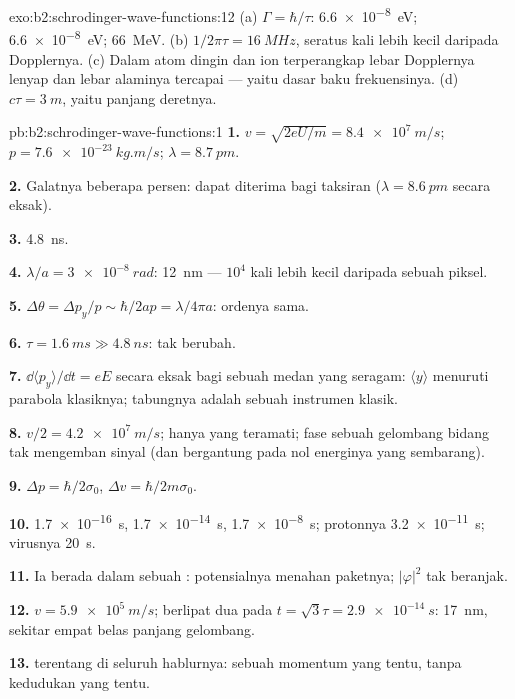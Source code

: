 \begin{solution}{exo:b2:schrodinger-wave-functions:12}
(a) $\Gamma = \hbar/\tau$: \qty{6.6e-8}{eV}; \qty{6.6e-8}{eV}; \qty{66}{MeV}. (b)
$1/2\pi\tau = \qty{16}{MHz}$, seratus kali lebih kecil daripada Dopplernya. (c) Dalam
atom dingin dan ion terperangkap lebar Dopplernya lenyap dan lebar
alaminya tercapai --- yaitu dasar baku frekuensinya. (d) $c\tau =
\qty{3}{m}$, yaitu panjang deretnya.
\end{solution}

\begin{solution}{pb:b2:schrodinger-wave-functions:1}
\textbf{1.} $v = \sqrt{2eU/m} = \qty{8.4e7}{m/s}$; $p = \qty{7.6e-23}{kg.m/s}$; $\lambda =
\qty{8.7}{pm}$.

\textbf{2.} Galatnya beberapa persen: dapat diterima bagi taksiran ($\lambda =
\qty{8.6}{pm}$ secara eksak).

\textbf{3.} \qty{4.8}{ns}.

\textbf{4.} $\lambda/a = \qty{3e-8}{rad}$: \qty{12}{nm} --- $10^4$ kali lebih kecil daripada sebuah
piksel.

\textbf{5.} $\Delta\theta = \Delta p_y/p \sim \hbar/2ap = \lambda/4\pi a$: ordenya sama.

\textbf{6.} $\tau = \qty{1.6}{ms} \gg \qty{4.8}{ns}$: tak berubah.

\textbf{7.} $\dd\langle p_y\rangle/\dd t = eE$ secara eksak bagi sebuah medan yang seragam:
$\langle y\rangle$ menuruti parabola klasiknya; tabungnya adalah sebuah
instrumen klasik.

\textbf{8.} $v/2 = \qty{4.2e7}{m/s}$; hanya  yang teramati;
fase sebuah gelombang bidang tak mengemban sinyal (dan bergantung pada nol
energinya yang sembarang).

\textbf{9.} $\Delta p = \hbar/2\sigma_0$, $\Delta v = \hbar/2m\sigma_0$.

\textbf{10.} \qty{1.7e-16}{s}, \qty{1.7e-14}{s}, \qty{1.7e-8}{s}; protonnya \qty{3.2e-11}{s};
virusnya \qty{20}{s}.

\textbf{11.} Ia berada dalam sebuah : potensialnya menahan
paketnya; $|\varphi|^2$ tak beranjak.

\textbf{12.} $v = \qty{5.9e5}{m/s}$; berlipat dua pada $t = \sqrt3\tau = \qty{2.9e-14}{s}$:
\qty{17}{nm}, sekitar empat belas panjang gelombang.

\textbf{13.}  terentang di seluruh hablurnya: sebuah
momentum yang tentu, tanpa kedudukan yang tentu.


\end{solution}
